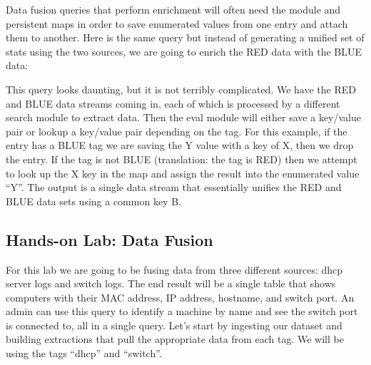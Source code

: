 Data fusion queries that perform enrichment will often need the
 module and persistent maps in order to save enumerated values
from one entry and attach them to another. Here is the same query but
instead of generating a unified set of stats using the two sources, we
are going to enrich the RED data with the BLUE data:


This query looks daunting, but it is not terribly complicated. We have
the RED and BLUE data streams coming in, each of which is processed by a
different search module to extract data. Then the eval module will
either save a key/value pair or lookup a key/value pair depending on the
tag. For this example, if the entry has a BLUE tag we are saving the Y
value with a key of X, then we drop the entry. If the tag is not
BLUE (translation: the tag is RED) then we attempt to look up the X key in the map and assign
the result into the enumerated value ``Y''. The output is a single data stream
that essentially unifies the RED and BLUE data sets using a common key
B.

\subsection{Hands-on Lab: Data Fusion}

For this lab we are going to be fusing data from three different
sources: dhcp server logs and switch logs. The end result will be a
single table that shows computers with their MAC address, IP address,
hostname, and switch port. An admin can use this query to identify a
machine by name and see the switch port is connected to, all in a single
query. Let's start by ingesting our dataset and building extractions
that pull the appropriate data from each tag. We will be using the
tags ``dhcp'' and ``switch''.

